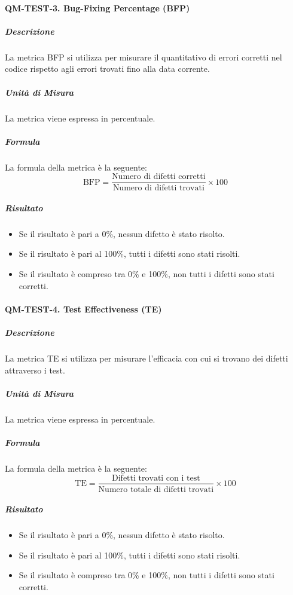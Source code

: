 		\paragraph{QM-TEST-3. Bug-Fixing Percentage (BFP)}

			\subparagraph{Descrizione}
			La metrica BFP si utilizza per misurare il quantitativo di errori corretti nel codice rispetto agli errori trovati fino alla data corrente.

			\subparagraph{Unità di Misura}
			La metrica viene espressa in percentuale.

			\subparagraph{Formula}
			La formula della metrica è la seguente:
			\[
				\text{BFP} = \frac{\text{Numero di difetti corretti}}{\text{Numero di difetti trovati}} \times 100
			\]

			\subparagraph{Risultato}
			\begin{itemize}
				\item Se il risultato è pari a 0\%, nessun difetto è stato risolto.
				\item Se il risultato è pari al 100\%, tutti i difetti sono stati risolti.
				\item Se il risultato è compreso tra 0\% e 100\%, non tutti i difetti sono stati corretti.
			\end{itemize}

		\paragraph{QM-TEST-4. Test Effectiveness (TE)}

			\subparagraph{Descrizione}
			La metrica TE si utilizza per misurare l'efficacia con cui si trovano dei difetti attraverso i test.

			\subparagraph{Unità di Misura}
			La metrica viene espressa in percentuale.

			\subparagraph{Formula}
			La formula della metrica è la seguente:
			\[
				\text{TE} = \frac{\text{Difetti trovati con i test}}{\text{Numero totale di difetti trovati}} \times 100
			\]

			\subparagraph{Risultato}
			\begin{itemize}
				\item Se il risultato è pari a 0\%, nessun difetto è stato risolto.
				\item Se il risultato è pari al 100\%, tutti i difetti sono stati risolti.
				\item Se il risultato è compreso tra 0\% e 100\%, non tutti i difetti sono stati corretti.
			\end{itemize}



